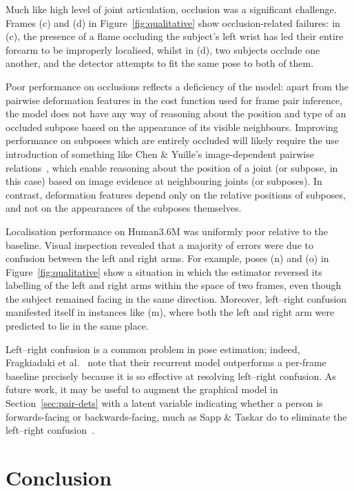 \documentclass[runningheads]{llncs}
\begin{document}
Much like high level of joint articulation, occlusion was a significant
challenge. Frames (c) and (d) in Figure~\ref{fig:qualitative} show
occlusion-related failures: in (c), the presence of a flame occluding the
subject's left wrist has led their entire forearm to be improperly localised,
whilst in (d), two subjects occlude one another, and the detector attempts to
fit the same pose to both of them.

Poor performance on occlusions reflects a deficiency of the model: apart from
the pairwise deformation features in the cost function used for frame pair
inference, the model does not have any way of reasoning about the position and
type of an occluded subpose based on the appearance of its visible neighbours.
Improving performance on subposes which are entirely occluded will likely
require the use introduction of something like Chen \& Yuille's image-dependent
pairwise relations~\cite{chen2014articulated}, which enable reasoning about the
position of a joint (or subpose, in this case) based on image evidence at
neighbouring joints (or subposes). In contrast, deformation features depend only
on the relative positions of subposes, and not on the appearances of the
subposes themselves.

Localisation performance on Human3.6M was uniformly poor relative to the
baseline. Visual inspection revealed that a majority of errors were due to
confusion between the left and right arms. For example, poses (n) and (o) in
Figure~\ref{fig:qualitative} show a situation in which the estimator reversed
its labelling of the left and right arms within the space of two frames, even
though the subject remained facing in the same direction. Moreover, left--right
confusion manifested itself in instances like (m), where both the left and right
arm were predicted to lie in the same place.

Left--right confusion is a common problem in pose estimation; indeed,
Fragkiadaki et al.~\cite{fragkiadaki2015recurrent} note that their recurrent
model outperforms a per-frame baseline precisely because it is so effective at
resolving left--right confusion. As future work, it may be useful to augment the
graphical model in Section~\ref{sec:pair-dets} with a latent variable indicating
whether a person is forwards-facing or backwards-facing, much as Sapp \& Taskar
do to eliminate the left--right confusion~\cite{sapp2013modec}.

\section{Conclusion}
\end{document}
